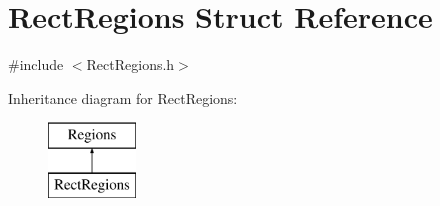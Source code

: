 \hypertarget{struct_rect_regions}{}\section{Rect\+Regions Struct Reference}
\label{struct_rect_regions}


{\ttfamily \#include $<$Rect\+Regions.\+h$>$}

Inheritance diagram for Rect\+Regions\+:\begin{figure}[H]
\begin{center}
\leavevmode
\includegraphics[height=2.000000cm]{struct_rect_regions}
\end{center}
\end{figure}
